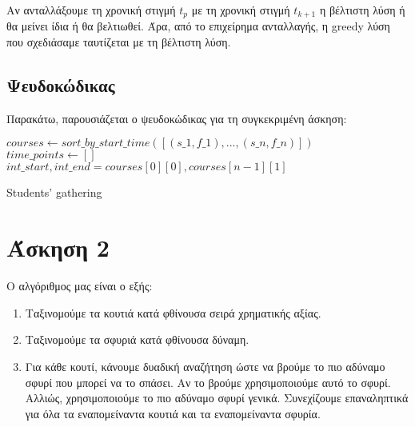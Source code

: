 \documentclass[a4paper,oneside, 11pt]{article}
\begin{document}
Αν ανταλλάξουμε τη χρονική στιγμή $t_p$ με τη χρονική στιγμή $t_{k+1}$ η βέλτιστη λύση ή θα μείνει ίδια ή θα βελτιωθεί. Άρα, από το επιχείρημα ανταλλαγής, η greedy λύση που σχεδιάσαμε ταυτίζεται με τη βέλτιστη λύση.


\subsection*{Ψευδοκώδικας}

Παρακάτω, παρουσιάζεται ο ψευδοκώδικας για τη συγκεκριμένη άσκηση:
\bigbreak
{\centering
	\begin{minipage}{.7\linewidth}
		\begin{algorithm}[H]
			\DontPrintSemicolon
			\bigbreak 
			 $courses \gets sort\_by\_start\_time([(s\_1, f\_1), ..., (s\_n, f\_n)])$ \\
			 $time\_points \gets []$ \\
			 $int\_start, int\_end = courses[0][0], courses[n-1][1]$ \\
			\bigbreak
			\caption{{Students' gathering}}
		\end{algorithm}
	\end{minipage}
	\par
}

\section*{Άσκηση 2}
Ο αλγόριθμος μας είναι ο εξής:
\begin{enumerate}
	\item Ταξινομούμε τα κουτιά κατά φθίνουσα σειρά χρηματικής αξίας.
	\item Ταξινομούμε τα σφυριά κατά φθίνουσα δύναμη.
	\item Για κάθε κουτί, κάνουμε δυαδική αναζήτηση ώστε να βρούμε το πιο αδύναμο σφυρί που μπορεί να το σπάσει. Αν το βρούμε χρησιμοποιούμε αυτό το σφυρί. Αλλιώς, χρησιμοποιούμε το πιο αδύναμο σφυρί γενικά. Συνεχίζουμε επαναληπτικά για όλα τα εναπομείναντα κουτιά και τα εναπομείναντα σφυρία.
\end{enumerate}
\end{document}
